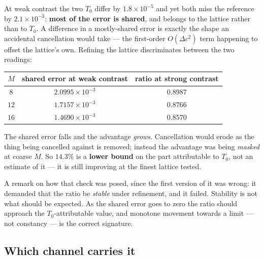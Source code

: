 \documentclass[11pt,a4paper]{article}
\begin{document}
At weak contrast the two $T_0$ differ by $1.8\times10^{-5}$ and yet both miss the
reference by $2.1\times10^{-3}$: \textbf{most of the error is shared}, and belongs
to the lattice rather than to $T_0$.  A difference in a mostly-shared error is
exactly the shape an accidental cancellation would take --- the first-order
$O(\Delta c^2)$ term happening to offset the lattice's own.  Refining the lattice
discriminates between the two readings:
\begin{center}
\begin{tabular}{ccc}
\toprule
$M$ & shared error at weak contrast & ratio at strong contrast\\
\midrule
$8$  & $2.0995\times10^{-3}$ & $0.8987$\\
$12$ & $1.7157\times10^{-3}$ & $0.8766$\\
$16$ & $1.4690\times10^{-3}$ & $0.8570$\\
\bottomrule
\end{tabular}
\end{center}
The shared error falls and the advantage \emph{grows}.  Cancellation would erode
as the thing being cancelled against is removed; instead the advantage was being
\emph{masked} at coarse $M$.  So $14.3\%$ is a \textbf{lower bound} on the part
attributable to $T_0$, not an estimate of it --- it is still improving at the
finest lattice tested.

A remark on how that check was posed, since the first version of it was wrong:
it demanded that the ratio be \emph{stable} under refinement, and it failed.
Stability is not what should be expected.  As the shared error goes to zero the
ratio should approach the $T_0$-attributable value, and monotone movement towards
a limit --- not constancy --- is the correct signature.

\subsection{Which channel carries it}\label{sec:whichchannel}
\end{document}
